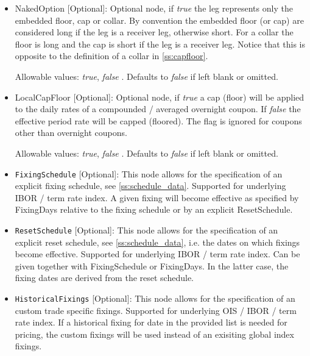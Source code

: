 \begin{itemize}
\item NakedOption [Optional]: Optional node, if \emph{true} the leg represents only the embedded floor, cap or collar.
  By convention the embedded floor (or cap) are considered long if the leg is a receiver leg, otherwise short. For a
  collar the floor is long and the cap is short if the leg is a receiver leg. Notice that this is opposite to
  the definition of a collar in \ref{ss:capfloor}.

 Allowable values: \emph{true}, \emph{false} . Defaults to \emph{false} if left blank or omitted.

\item LocalCapFloor [Optional]: Optional node, if \emph{true} a cap (floor) will be applied to the daily rates of a
  compounded / averaged overnight coupon. If \emph{false} the effective period rate will be capped (floored). The flag
  is ignored for coupons other than overnight coupons.

 Allowable values: \emph{true}, \emph{false} . Defaults to \emph{false} if left blank or omitted.

\item \lstinline!FixingSchedule! [Optional]: This node allows for the specification of an explicit fixing schedule, see
  \ref{ss:schedule_data}. Supported for underlying IBOR / term rate index. A given fixing will become effective as
  specified by FixingDays relative to the fixing schedule or by an explicit ResetSchedule.

\item \lstinline!ResetSchedule! [Optional]: This node allows for the specification of an explicit reset schedule, see
  \ref{ss:schedule_data}, i.e. the dates on which fixings become effective. Supported for underlying IBOR / term rate
  index. Can be given together with FixingSchedule or FixingDays. In the latter case, the fixing dates are derived from
  the reset schedule.

\item \lstinline!HistoricalFixings! [Optional]: This node allows for the specification of an custom trade specific fixings. Supported for underlying OIS / IBOR / term rate
  index. If a historical fixing for date in the provided list is needed for pricing,  the custom fixings will be used instead of an exisiting global index fixings.
\end{itemize}
